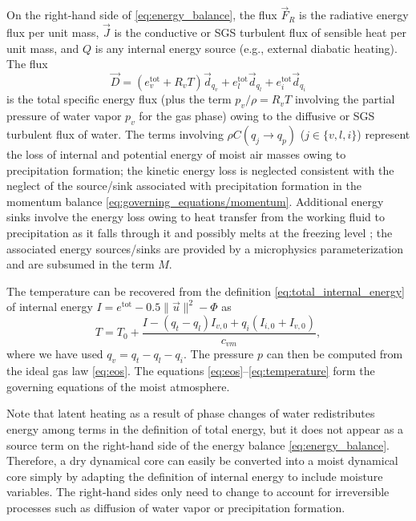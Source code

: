 \documentclass{article}
\begin{document}
On the right-hand side of \eqref{eq:energy_balance}, the flux $\vec{F}_R$ is the radiative energy flux per unit mass, $\vec{J}$ is the conductive or SGS turbulent flux of sensible heat per unit mass, and $Q$ is any internal energy source (e.g., external diabatic heating). The flux 
\begin{equation}
\vec{D} = (e_v^{\mathrm{tot}} + R_v T) \vec{d}_{q_v} + e_l^{\mathrm{tot}} \vec{d}_{q_l} +  e_i^{\mathrm{tot}} \vec{d}_{q_i}
\end{equation}
is the total specific energy flux (plus the term $p_v/\rho = R_v T$ involving the partial pressure of water vapor $p_v$ for the gas phase) owing to the diffusive or SGS turbulent flux of water. The terms involving $\rho C(q_j \rightarrow q_p)$ ($j \in \{ v, l, i \}$) represent the loss of internal and potential energy of moist air masses owing to precipitation formation; the kinetic energy loss is neglected consistent with the neglect of the source/sink associated with precipitation formation in the momentum balance \eqref{eq:governing_equations/momentum}. Additional energy sinks involve the energy loss owing to heat transfer from the working fluid to precipitation as it falls through it and possibly melts at the freezing level \citep{Raymond13b}; the associated energy sources/sinks are provided by a microphysics parameterization and are subsumed in the term $M$.

The temperature can be recovered from the definition \eqref{eq:total_internal_energy} of internal energy $I = e^{\mathrm{tot}} - 0.5 \| \vec{u} \|^2 - \Phi$  as 
\begin{equation}
    T = T_0 + \frac{I - (q_t - q_l) I_{v,0} + q_i (I_{i,0} + I_{v,0})}{c_{vm}},
    \label{eq:temperature}
\end{equation}
where we have used $q_v = q_t - q_l - q_i$. The pressure $p$ can then be computed from the ideal gas law \eqref{eq:eos}. The equations \eqref{eq:eos}--\eqref{eq:temperature} form the governing equations of the moist atmosphere.

Note that latent heating as a result of phase changes of water redistributes energy among terms in the definition of total energy, but it does not appear as a source term on the right-hand side of the energy balance \eqref{eq:energy_balance}. Therefore, a dry dynamical core can easily be converted into a moist dynamical core simply by adapting the definition of internal energy to include moisture variables. The right-hand sides only need to change to account for irreversible processes such as diffusion of water vapor or precipitation formation. 
\end{document}
